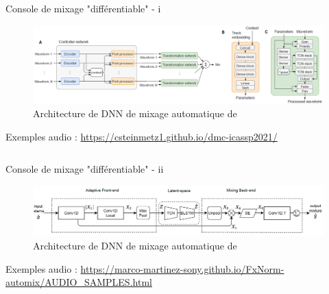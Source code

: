 \documentclass[9pt, aspectratio=169]{beamer}
\begin{document}
\begin{frame}{Console de mixage "différentiable" - i} %

\begin{figure}
	\includegraphics[width=\textwidth]{fig/steinmetz2021_diffmix.png}
	\caption{Architecture de DNN de mixage automatique de \cite{steinmetz_automatic_2020}}
\end{figure}
Exemples audio : \scriptsize \url{https://csteinmetz1.github.io/dmc-icassp2021/}

\begin{columns}
    \begin{column}{0.48\textwidth}
    \end{column}
    \begin{column}{0.48\textwidth}
    \end{column}
\end{columns}
\end{frame}

\begin{frame}{Console de mixage "différentiable" - ii} %

\begin{figure}
	\includegraphics[width=\textwidth]{fig/martinez_ramirez2022_architecture.png}
	\caption{Architecture de DNN de mixage automatique de \cite{martinez-ramirez_automatic_2022}}
\end{figure}
Exemples audio : \scriptsize \url{https://marco-martinez-sony.github.io/FxNorm-automix/AUDIO_SAMPLES.html}

\begin{columns}
    \begin{column}{0.48\textwidth}
    \end{column}
    \begin{column}{0.48\textwidth}
    \end{column}
\end{columns}
\end{frame}
\end{document}
